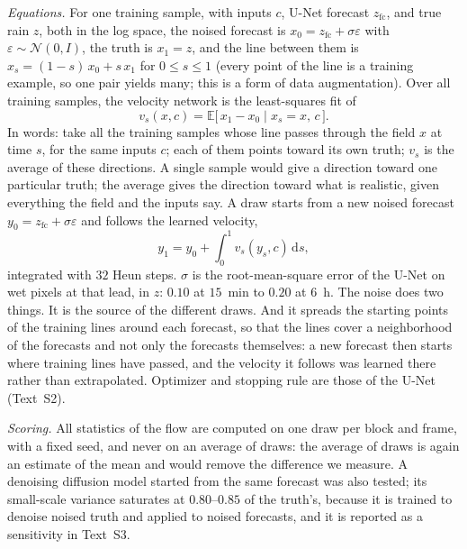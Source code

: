 \documentclass[draft]{agujournal2019}
\begin{document}
\textit{Equations.} For one training sample, with inputs $c$, U-Net
forecast $z_{\mathrm{fc}}$, and true rain $z$, both in the log space, the
noised forecast is $x_0 = z_{\mathrm{fc}} + \sigma\varepsilon$ with
$\varepsilon \sim \mathcal{N}(0, I)$, the truth is $x_1 = z$, and the line
between them is $x_s = (1 - s)\,x_0 + s\,x_1$ for $0 \le s \le 1$ (every
point of the line is a training example, so one pair yields many; this is
a form of data augmentation). Over all training samples, the velocity network is the least-squares fit of
\begin{equation}
v_s(x, c) = \mathbb{E}\big[\,x_1 - x_0 \;\big|\; x_s = x,\, c\,\big] .
\label{eq:velocity}
\end{equation}
In words: take all the training samples whose line passes through the
field $x$ at time $s$, for the same inputs $c$; each of them points toward
its own truth; $v_s$ is the average of these directions. A single sample
would give a direction toward one particular truth; the average gives the
direction toward what is realistic, given everything the field and the
inputs say. A draw starts from a new noised forecast $y_0 = z_{\mathrm{fc}} + \sigma\varepsilon$
and follows the learned velocity,
\begin{equation}
y_1 = y_0 + \int_0^1 v_s(y_s, c)\,\mathrm{d}s ,
\label{eq:flow}
\end{equation}
integrated with $32$ Heun steps. $\sigma$ is the root-mean-square error of
the U-Net on wet pixels at that lead, in $z$: $0.10$ at $15$~min to $0.20$
at $6$~h. The noise does two things. It is the source of the different
draws. And it spreads the starting points of the training lines around
each forecast, so that the lines cover a neighborhood of the forecasts and
not only the forecasts themselves: a new forecast then starts where
training lines have passed, and the velocity it follows was learned
there rather than extrapolated. Optimizer and stopping rule are those of the U-Net (Text~S2).

\textit{Scoring.} All statistics of the flow are computed on one draw per
block and frame, with a fixed seed, and never on an average of draws: the
average of draws is again an estimate of the mean and would remove the
difference we measure. A denoising diffusion model started from the same
forecast was also tested; its small-scale variance saturates at
$0.80$--$0.85$ of the truth's, because it is trained to denoise noised
truth and applied to noised forecasts, and it is reported as a
sensitivity in Text~S3.
\end{document}
